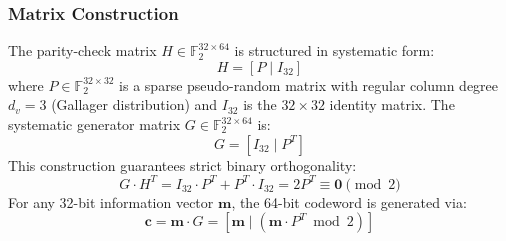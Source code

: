 \documentclass[conference]{IEEEtran}
\begin{document}
\subsubsection{Matrix Construction}
The parity-check matrix $H \in \mathbb{F}_2^{32 \times 64}$ is structured in systematic form:
\begin{equation}
H = [P \mid I_{32}]
\end{equation}
where $P \in \mathbb{F}_2^{32 \times 32}$ is a sparse pseudo-random matrix with regular column degree $d_v = 3$ (Gallager distribution) and $I_{32}$ is the $32 \times 32$ identity matrix. The systematic generator matrix $G \in \mathbb{F}_2^{32 \times 64}$ is:
\begin{equation}
G = [I_{32} \mid P^T]
\end{equation}
This construction guarantees strict binary orthogonality:
\begin{equation}
G \cdot H^T = I_{32} \cdot P^T + P^T \cdot I_{32} = 2 P^T \equiv \mathbf{0} \pmod 2
\end{equation}
For any 32-bit information vector $\mathbf{m}$, the 64-bit codeword is generated via:
\begin{equation}
\mathbf{c} = \mathbf{m} \cdot G = [\mathbf{m} \mid (\mathbf{m} \cdot P^T \bmod 2)]
\end{equation}
\end{document}
